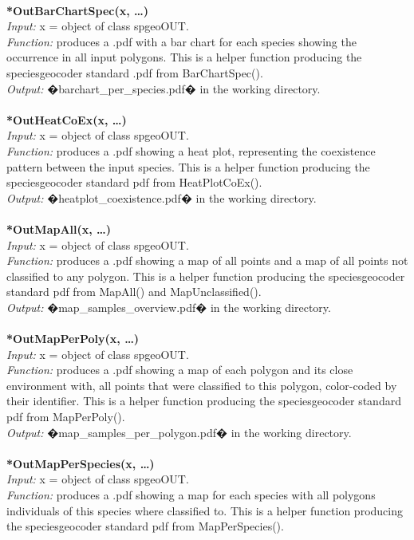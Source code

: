 \documentclass[a4paper,titlepage,11pt]{scrreprt}
\begin{document}
\\
\textbf{*OutBarChartSpec(x, \dots)}\\
\textit{Input:} x = object of class spgeoOUT.\\
\textit{Function:} produces a .pdf with a bar chart for each species showing the occurrence in all input polygons. This is a helper function producing the speciesgeocoder standard .pdf from BarChartSpec().\\
\textit{Output:} �barchart\_per\_species.pdf� in the working directory.\\
\\
\textbf{*OutHeatCoEx(x, \dots)}\\
\textit{Input:} x = object of class spgeoOUT.\\
\textit{Function:} produces a .pdf showing a heat plot, representing the coexistence pattern between the input species. This is a helper function producing the speciesgeocoder standard pdf from HeatPlotCoEx().\\
\textit{Output:} �heatplot\_coexistence.pdf� in the working directory.\\
\\
\textbf{*OutMapAll(x, \dots)}\\
\textit{Input:} x = object of class spgeoOUT.\\
\textit{Function:} produces a .pdf showing a map of all points and a map of all points not classified to any polygon. This is a helper function producing the speciesgeocoder standard pdf from MapAll() and MapUnclassified().\\
\textit{Output:} �map\_samples\_overview.pdf� in the working directory.\\
\\
\textbf{*OutMapPerPoly(x, \dots)}\\
\textit{Input:} x = object of class spgeoOUT.\\
\textit{Function:} produces a .pdf showing a map of each polygon and its close environment with, all points that were classified to this polygon, color-coded by their identifier. This is a helper function producing the speciesgeocoder standard pdf from MapPerPoly().\\
\textit{Output:} �map\_samples\_per\_polygon.pdf� in the working directory.\\
\\
\textbf{*OutMapPerSpecies(x, \dots)}\\
\textit{Input:} x = object of class spgeoOUT.\\
\textit{Function:} produces a .pdf showing a map for each species with all polygons individuals of this species where classified to. This is a helper function producing the speciesgeocoder standard pdf from MapPerSpecies().\\
\end{document}
